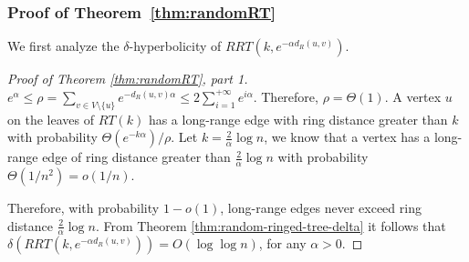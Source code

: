 \documentclass[11pt]{article}
\newcommand{\diam}{\mathrm{diam}}
\begin{document}
	



\subsubsection{Proof of Theorem~\ref{thm:randomRT}}





We first analyze the $\delta$-hyperbolicity of $RRT(k,e^{-\alpha d_R(u,v)})$.

\begin{proof}[Proof of Theorem \ref{thm:randomRT}, part 1]
$e^{\alpha} \leq \rho=\sum_{v \in V \setminus \{u\}}e^{-d_R(u,v)\alpha} \leq 2\sum_{i=1}^{+\infty}e^{i\alpha}$. 
Therefore, $\rho=\Theta(1)$. 
A vertex $u$ on the leaves of $RT(k)$ 
	has a long-range edge with ring distance greater than $k$ with 
	probability $\Theta(e^{-k\alpha})/\rho$. 
Let $k=\frac{2}{\alpha}\log n$, we know that a vertex 
	has a long-range edge of ring distance greater 
	than $\frac{2}{\alpha}\log n$ with probability $\Theta(1/n^2)=o(1/n)$.

Therefore, with probability $1-o(1)$, 
	long-range edges never exceed ring distance $\frac{2}{\alpha}\log n$. 
From Theorem \ref{thm:random-ringed-tree-delta} 
	it follows that
	$\delta(RRT(k,e^{-\alpha d_R(u,v)}))=O(\log \log n)$, for any $\alpha > 0$.
\end{proof}
\end{document}
